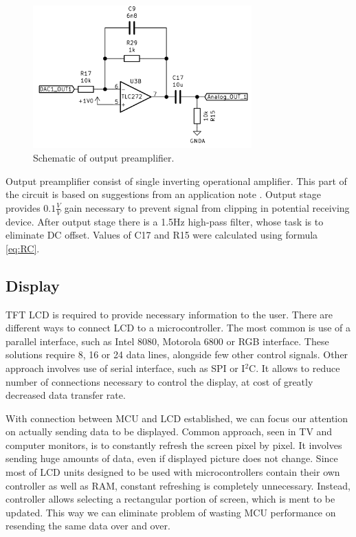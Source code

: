\documentclass[a4paper,twoside,12pt]{book}
\begin{document}
\begin{figure}[H]
    \centering
    \includegraphics[width=0.75\textwidth]{images/Output_preamp}
    \caption{Schematic of output preamplifier.}
    \label{fig:output}
\end{figure}

Output preamplifier consist of single inverting operational amplifier.
This part of the circuit is based on suggestions from 
an application note \cite{ST:DAC}.
Output stage provides \(0.1\frac{V}{V}\) gain necessary to prevent
signal from clipping in potential receiving device.
After output stage there is a 1.5Hz high-pass filter,
whose task is to eliminate DC offset.
Values of C17 and R15 were calculated using formula \ref{eq:RC}.

\subsection{Display}
TFT LCD is required to provide necessary information to the user.
There are different ways to connect LCD to a microcontroller.
The most common is use of a parallel interface,
such as Intel 8080, Motorola 6800 or RGB interface.
These solutions require 8, 16 or 24 data lines,
alongside few other control signals.
Other approach involves use of serial interface,
such as SPI or I\(^2\)C.
It allows to reduce number of connections necessary to control the display,
at cost of greatly decreased data transfer rate.

With connection between MCU and LCD established,
we can focus our attention on actually sending data to be displayed.
Common approach, seen in TV and computer monitors,
is to constantly refresh the screen pixel by pixel.
It involves sending huge amounts of data,
even if displayed picture does not change.
Since most of LCD units designed to be used with microcontrollers
contain their own controller as well as RAM,
constant refreshing is completely unnecessary.
Instead, controller allows selecting a rectangular portion
of screen, which is ment to be updated.
This way we can eliminate problem of wasting MCU performance
on resending the same data over and over.
\end{document}
